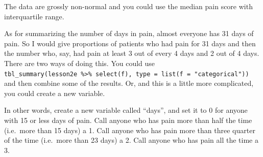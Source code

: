 \documentclass[]{book}
\newenvironment{Shaded}{\begin{snugshade}}{\end{snugshade}}
\newcommand{\DataTypeTok}[1]{\textcolor[rgb]{0.13,0.29,0.53}{#1}}
\newcommand{\DecValTok}[1]{\textcolor[rgb]{0.00,0.00,0.81}{#1}}
\newcommand{\KeywordTok}[1]{\textcolor[rgb]{0.13,0.29,0.53}{\textbf{#1}}}
\newcommand{\NormalTok}[1]{#1}
\newcommand{\OperatorTok}[1]{\textcolor[rgb]{0.81,0.36,0.00}{\textbf{#1}}}
\newcommand{\StringTok}[1]{\textcolor[rgb]{0.31,0.60,0.02}{#1}}
\begin{document}
The data are grossly non-normal and you could use the median pain score
with interquartile range.

As for summarizing the number of days in pain, almost everyone has 31
days of pain. So I would give proportions of patients who had pain for
31 days and then the number who, say, had pain at least 3 out of every 4
days and 2 out of 4 days. There are two ways of doing this. You could
use
\texttt{tbl\_summary(lesson2e\ \%\textgreater{}\%\ select(f),\ type\ =\ list(f\ =\ "categorical"))}
and then combine some of the results. Or, and this is a little more
complicated, you could create a new variable.

\begin{Shaded}
\end{Shaded}

In other words, create a new variable called ``days'', and set it to 0
for anyone with 15 or less days of pain. Call anyone who has pain more
than half the time (i.e.~more than 15 days) a 1. Call anyone who has
pain more than three quarter of the time (i.e.~more than 23 days) a 2.
Call anyone who has pain all the time a 3.

\begin{Shaded}
\end{Shaded}
\end{document}
